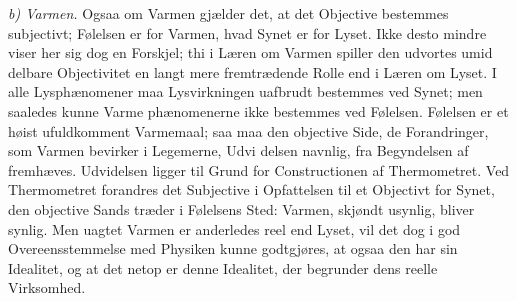 \documentclass[12pt,a4paper]{book}
\newcommand{\runin}[1]{\emph{#1}\hspace{0.4em}}
\begin{document}
\runin{b) Varmen.} Ogsaa om Varmen gjælder det, at det Objective
bestemmes subjectivt; Følelsen er for Varmen, hvad Synet er for Lyset.
Ikke desto mindre viser her sig dog en Forskjel; thi i Læren om Varmen
spiller den udvortes umid\-%
delbare Objectivitet en langt mere fremtrædende Rolle end i Læren om
Lyset. I alle Lysphænomener maa Lysvirkningen uafbrudt bestemmes ved
Synet; men saaledes kunne Varme\-%
phænomenerne ikke bestemmes ved Følelsen. Følelsen er et høist
ufuldkomment Varmemaal; saa maa den objective Side, de Forandringer,
som Varmen bevirker i Legemerne, Udvi\-%
delsen navnlig, fra Begyndelsen af fremhæves. Udvidelsen
ligger til Grund for Constructionen af Thermometret. Ved Thermometret
forandres det Subjective i Opfattelsen til et Objectivt for Synet, den
objective Sands træder i Følelsens Sted: Varmen, skjøndt usynlig,
bliver synlig. Men uagtet Varmen er anderledes reel end Lyset, vil det
dog i god Overeensstemmelse med Physiken kunne godtgjøres, at ogsaa den
har sin Idealitet, og at det netop er denne Idealitet, der begrunder
dens reelle Virksomhed.
\end{document}
